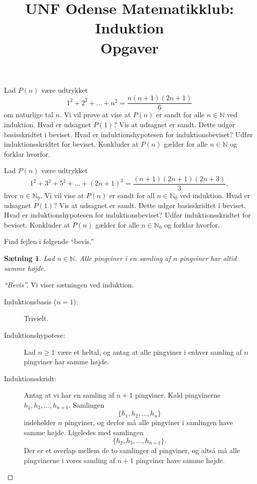 \documentclass[a4paper,12pt]{article}
\title{UNF Odense Matematikklub: Induktion\\
\Large{Opgaver}}
\author{}
\date{}
\theoremstyle{plain}
\newtheorem{saetning}{Sætning}
\newcommand{\N}{\mathbb{N}}
\begin{document}
\maketitle
\thispagestyle{empty}
\newpage
\setcounter{page}{1}
\begin{Exercise}[label={ex:1}]
  Lad \(P(n)\) være udtrykket
  \[
    1^2+2^2+\dots+n^2=\frac{n(n+1)(2n+1)}{6}
    \]
    om naturlige tal \(n\). Vi vil prøve at vise at \(P(n)\) er sandt for alle \(n\in\N\) ved induktion.
    \Question Hvad er udsagnet \(P(1)\)? Vis at udsagnet er sandt. Dette udgør basisskridtet i beviset.
    \Question Hvad er induktionshypotesen for induktionsbeviset?
    \Question Udfør induktionsskridtet for beviset.
    \Question Konkluder at \(P(n)\) gælder for alle \(n\in\N\) og forklar hvorfor.
\end{Exercise}
\begin{Exercise}
 Lad \(P(n)\) være udtrykket
  \[
    1^2+3^2+5^2+\dots+(2n+1)^2=\frac{(n+1)(2n+1)(2n+3)}{3},
    \]
    hvor \(n\in\N_0\). Vi vil vise at \(P(n)\) er sandt for all \(n\in\N_0\) ved induktion.
    \Question Hvad er udsagnet \(P(1)\)? Vis at udsagnet er sandt. Dette udgør basisskridtet i beviset.
    \Question Hvad er induktionshypotesen for induktionsbeviset?
    \Question Udfør induktionsskridtet for beviset.
    \Question Konkluder at \(P(n)\) gælder for alle \(n\in\N_0\) og forklar hvorfor.
\end{Exercise}
\begin{Exercise}
  Find fejlen i følgende ``bevis.''
  \begin{saetning}
    Lad \(n\in\N\). Alle pingviner i en samling af \(n\) pingviner har altid samme højde.
  \end{saetning}
  \begin{proof}[``Bevis'']
    Vi viser sætningen ved induktion.
    \begin{description}
    \item[Induktionsbasis (\(n=1\)):] Trivielt.
    \item[Induktionshypotese:] Lad \(n\ge 1\) være et heltal, og antag at alle pingviner i enhver samling af \(n\) pingviner har samme højde.
    \item[Induktionsskridt:] Antag at vi har en samling af \(n+1\) pingviner. Kald pingvinerne \(h_1,h_2,\dots,h_{n+1}\). Samlingen
      \[
        \{h_1,h_2,\ldots,h_n\}
      \]
        indeholder \(n\) pingviner, og derfor må alle pingviner i samlingen have samme højde. Ligeledes med samlingen
      \[
          \{h_2,h_3,\ldots,h_{n+1}\}.
      \]
      Der er et overlap mellem de to samlinger af pingviner, og altså må alle pingvinerne i vores samling af \(n+1\) pingviner have samme højde.
    \end{description}
  \end{proof}
\end{Exercise}
\end{document}
